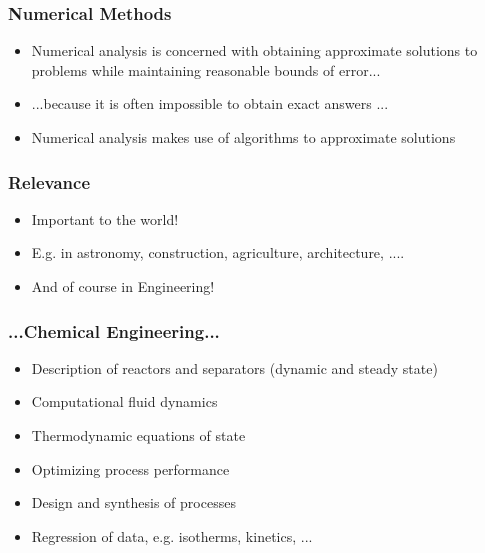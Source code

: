 \documentclass[11pt,table,final,fleqn,xcolor={usenames,dvipsnames}]{beamer}
\begin{document}
\begin{frame}
 \frametitle{Numerical Methods}
 \begin{itemize}
  \item Numerical analysis is concerned with obtaining approximate solutions to problems while maintaining reasonable bounds of error...
  \item ...because it is often impossible to obtain exact answers ...
  \item Numerical analysis makes use of algorithms to
approximate solutions
 \end{itemize}
\end{frame}

\begin{frame}
 \frametitle{Relevance}
  \begin{itemize}
  \item Important to the world!
  \item E.g. in astronomy, construction, agriculture, architecture, ....
  \item And of course in Engineering!
 \end{itemize}
\end{frame}

\begin{frame}
 \frametitle{...Chemical Engineering...}
  \begin{itemize}
	  \item Description of reactors and separators (dynamic and steady state)
		\item Computational fluid dynamics
		\item Thermodynamic equations of state
		\item Optimizing process performance
		\item Design and synthesis of processes
		\item Regression of data, e.g. isotherms, kinetics, ...
 \end{itemize}
\end{frame}
\end{document}
